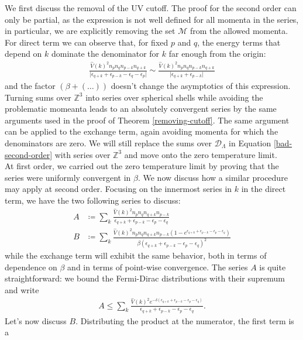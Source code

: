 We first discuss the removal of the UV cutoff. The proof for the second order can only be
partial, as the expression is not well defined for all momenta in the series, in particular,
we are explicitly removing the set $\mathcal{M}$ from the allowed momenta. For direct term we
can observe that, for fixed $p$ and $q$, the energy terms that depend on $k$ dominate the
denominator for $k$ far enough from the origin:
\begin{align*}
	\frac{\hat{V}(k)^2n_pn_qn_{p-k}n_{q+k}}{\vert \epsilon_{q+k}+\epsilon_{p-k}-\epsilon_q-\epsilon_p\vert}
	\sim \frac{\hat{V}(k)^2n_pn_qn_{p-k}n_{q+k}}{\vert \epsilon_{q+k}+\epsilon_{p-k}\vert}
\end{align*}
and the factor $(\beta+(\ldots))$ doesn't change the asymptotics of this expression.
Turning sums over $\mathbb{Z}^3$ into series over spherical shells while avoiding the
problematic momeanta leads to an absolutely convergent series by the same arguments used in
the proof of Theorem \ref{removing-cutoff}. The same argument can be applied to the exchange
term, again avoiding momenta for which the denominators are zero. We will still replace the
sums over $\mathcal{D}_\Lambda$ in Equation \eqref{bad-second-order} with series over
$\mathbb{Z}^3$ and move onto the zero temperature limit.
\\
At first order, we carried out the zero temperature limit by proving that the series were
uniformly convergent in $\beta$. We now discuss how a similar procedure may apply at second
order. Focusing on the innermost series in $k$ in the direct term, we have the two following
series to discuss:
\begin{align*}
	A&\coloneq\sum_k \frac{\hat{V}(k)^2n_pn_qn_{q+k}n_{p-k}}{\epsilon_{q+k}+\epsilon_{p-k}-\epsilon_p-\epsilon_q}
	\\
	B&\coloneq\sum_k \frac{\hat{V}(k)^2n_pn_qn_{q+k}n_{p-k}(1-e^{\epsilon_{q+k}+\epsilon_{p-k}-\epsilon_p-\epsilon_q})}
	{\beta(\epsilon_{q+k}+\epsilon_{p-k}-\epsilon_p-\epsilon_q)^2}
\end{align*}
while the exchange term will exhibit the same behavior, both in terms of dependence on $\beta$
and in terms of point-wise convergence. The series $A$ is quite straightforward: we bound the
Fermi-Dirac distributions with their supremum and write
\begin{align*}
	A \leq \sum_k \frac{\hat{V}(k)^2e^{-\delta(\epsilon_{q+k}+\epsilon_{p-k}-\epsilon_p-\epsilon_q)}}
	{\epsilon_{q+k}+\epsilon_{p-k}-\epsilon_p-\epsilon_q}.
\end{align*}
Let's now discuss $B$. Distributing the product at the numerator, the first term is a
